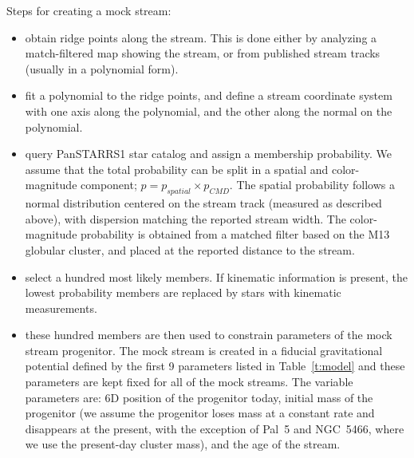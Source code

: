 \documentclass[modern]{aastex61}
\begin{document}
Steps for creating a mock stream:
\begin{itemize}
 \item obtain ridge points along the stream. This is done either by analyzing a match-filtered map showing the stream, or from published stream tracks (usually in a polynomial form).
 \item fit a polynomial to the ridge points, and define a stream coordinate system with one axis along the polynomial, and the other along the normal on the polynomial.
 \item query PanSTARRS1 star catalog and assign a membership probability. We assume that the total probability can be split in a spatial and color-magnitude component; $p = p_{spatial} \times p_{CMD}$. The spatial probability follows a normal distribution centered on the stream track (measured as described above), with dispersion matching the reported stream width. The color-magnitude probability is obtained from a matched filter based on the M13 globular cluster, and placed at the reported distance to the stream.
 \item select a hundred most likely members. If kinematic information is present, the lowest probability members are replaced by stars with kinematic measurements.
 \item these hundred members are then used to constrain parameters of the mock stream progenitor. The mock stream is created in a fiducial gravitational potential defined by the first 9 parameters listed in Table~\ref{t:model} and these parameters are kept fixed for all of the mock streams. The variable parameters are: 6D position of the progenitor today, initial mass of the progenitor (we assume the progenitor loses mass at a constant rate and disappears at the present, with the exception of Pal~5 and NGC~5466, where we use the present-day cluster mass), and the age of the stream. 
\end{itemize}
\end{document}
